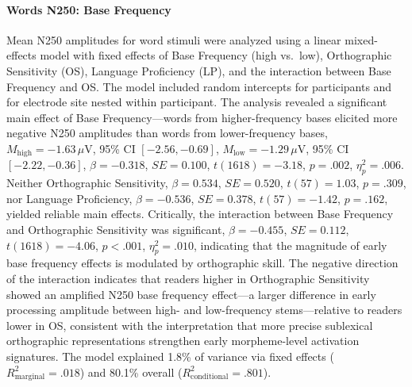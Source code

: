 \documentclass[utf8]{FrontiersinHarvard} %
\begin{document}
	\paragraph*{Words N250: Base Frequency}
	Mean N250 amplitudes for word stimuli were analyzed using a linear mixed-effects model with fixed effects of Base Frequency (high vs.\ low), Orthographic Sensitivity (OS), Language Proficiency (LP), and the interaction between Base Frequency and OS. The model included random intercepts for participants and for electrode site nested within participant. The analysis revealed a significant main effect of Base Frequency—words from higher-frequency bases elicited more negative N250 amplitudes than words from lower-frequency bases, $M_{\mathrm{high}} = -1.63\,\mu$V, 95\% CI $[-2.56, -0.69]$, $M_{\mathrm{low}} = -1.29\,\mu$V, 95\% CI $[-2.22, -0.36]$, $\beta = -0.318$, $SE = 0.100$, $t(1618) = -3.18$, $p = .002$, $\eta^2_p = .006$. Neither Orthographic Sensitivity, $\beta = 0.534$, $SE = 0.520$, $t(57) = 1.03$, $p = .309$, nor Language Proficiency, $\beta = -0.536$, $SE = 0.378$, $t(57) = -1.42$, $p = .162$, yielded reliable main effects. Critically, the interaction between Base Frequency and Orthographic Sensitivity was significant, $\beta = -0.455$, $SE = 0.112$, $t(1618) = -4.06$, $p < .001$, $\eta^2_p = .010$, indicating that the magnitude of early base frequency effects is modulated by orthographic skill. The negative direction of the interaction indicates that readers higher in Orthographic Sensitivity showed an amplified N250 base frequency effect—a larger difference in early processing amplitude between high- and low-frequency stems—relative to readers lower in OS, consistent with the interpretation that more precise sublexical orthographic representations strengthen early morpheme-level activation signatures. The model explained 1.8\% of variance via fixed effects ($R^2_{\mathrm{marginal}} = .018$) and 80.1\% overall ($R^2_{\mathrm{conditional}} = .801$).
	
\end{document}

